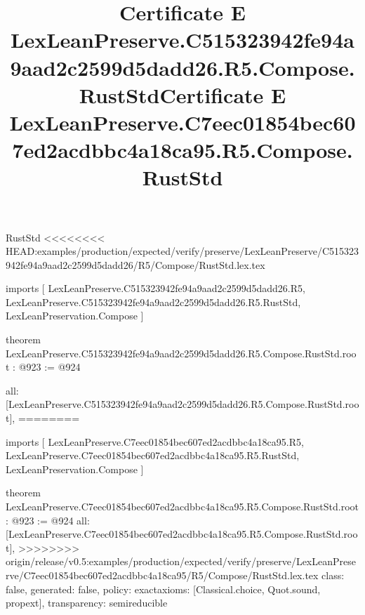 \begin{lexlean}{RustStd}
<<<<<<<< HEAD:examples/production/expected/verify/preserve/LexLeanPreserve/C515323942fe94a9aad2c2599d5dadd26/R5/Compose/RustStd.lex.tex
\title{Certificate E LexLeanPreserve.C515323942fe94a9aad2c2599d5dadd26.R5.Compose.RustStd}
\begin{coremodule}
imports [
  LexLeanPreserve.C515323942fe94a9aad2c2599d5dadd26.R5,
  LexLeanPreserve.C515323942fe94a9aad2c2599d5dadd26.R5.RustStd,
  LexLeanPreservation.Compose
]

theorem LexLeanPreserve.C515323942fe94a9aad2c2599d5dadd26.R5.Compose.RustStd.root : @923 := @924 {
  all: [LexLeanPreserve.C515323942fe94a9aad2c2599d5dadd26.R5.Compose.RustStd.root],
========
\title{Certificate E LexLeanPreserve.C7eec01854bec607ed2acdbbc4a18ca95.R5.Compose.RustStd}
\begin{coremodule}
imports [
  LexLeanPreserve.C7eec01854bec607ed2acdbbc4a18ca95.R5,
  LexLeanPreserve.C7eec01854bec607ed2acdbbc4a18ca95.R5.RustStd,
  LexLeanPreservation.Compose
]

theorem LexLeanPreserve.C7eec01854bec607ed2acdbbc4a18ca95.R5.Compose.RustStd.root : @923 := @924 {
  all: [LexLeanPreserve.C7eec01854bec607ed2acdbbc4a18ca95.R5.Compose.RustStd.root],
>>>>>>>> origin/release/v0.5:examples/production/expected/verify/preserve/LexLeanPreserve/C7eec01854bec607ed2acdbbc4a18ca95/R5/Compose/RustStd.lex.tex
  class: false,
  generated: false,
  policy: exact{axioms: [Classical.choice, Quot.sound, propext]},
  transparency: semireducible
}


\end{coremodule}}
\end{coremodule}
\end{lexlean}
